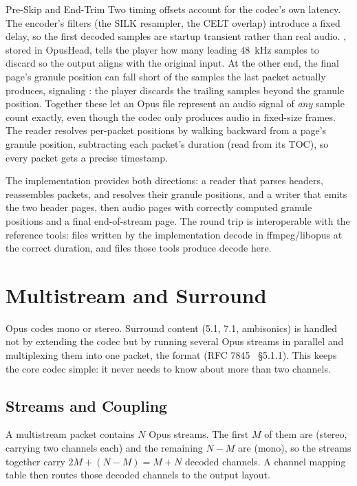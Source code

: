 \begin{concept}{Pre-Skip and End-Trim}
  Two timing offsets account for the codec's own latency. The encoder's filters
  (the SILK resampler, the CELT overlap) introduce a fixed delay, so the first
  decoded samples are startup transient rather than real audio. , stored in OpusHead, tells the player how many leading 48~kHz samples to
  discard so the output aligns with the original input. At the other end, the
  final page's granule position can fall short of the samples the last packet
  actually produces, signaling : the player discards the
  trailing samples beyond the granule position. Together these let an Opus file
  represent an audio signal of \emph{any} sample count exactly, even though the
  codec only produces audio in fixed-size frames. The reader resolves per-packet
  positions by walking backward from a page's granule position, subtracting each
  packet's duration (read from its TOC), so every packet gets a precise
  timestamp.
\end{concept}

The implementation provides both directions: a reader that parses headers,
reassembles packets, and resolves their granule positions, and a writer that
emits the two header pages, then audio pages with correctly computed granule
positions and a final end-of-stream page. The round trip is interoperable with
the reference tools: files written by the implementation decode in
ffmpeg/libopus at the correct duration, and files those tools produce decode
here.

\section{Multistream and Surround}\label{sec:multistream}

Opus codes mono or stereo. Surround content (5.1, 7.1, ambisonics) is
handled not
by extending the codec but by running several Opus streams in parallel and
multiplexing them into one packet, the  format
(RFC 7845~\cite{rfc7845} \S5.1.1). This keeps the core codec simple: it never
needs to know about more than two channels.

\subsection{Streams and Coupling}\label{subsec:ms_streams}

A multistream packet contains $N$ Opus streams. The first $M$ of them are
 (stereo, carrying two channels each) and the remaining $N-M$
are  (mono), so the streams together carry $2M + (N-M) = M+N$
decoded channels. A channel mapping table then routes those decoded channels to
the output layout.

